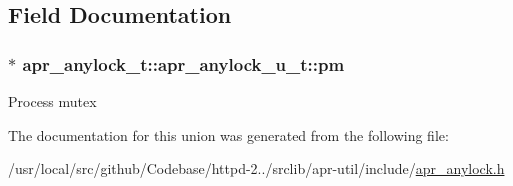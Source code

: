 \subsection{Field Documentation}
\subsubsection[{\texorpdfstring{pm}{pm}}]{$\ast$ apr\+\_\+anylock\+\_\+t\+::apr\+\_\+anylock\+\_\+u\+\_\+t\+::pm}\hypertarget{unionapr__anylock__t_1_1apr__anylock__u__t_aeb1a5d1e7a4e326482983ea956caae42}{}\label{unionapr__anylock__t_1_1apr__anylock__u__t_aeb1a5d1e7a4e326482983ea956caae42}
Process mutex 

The documentation for this union was generated from the following file\+:\begin{DoxyCompactItemize}
\item 
/usr/local/src/github/\+Codebase/httpd-\/2../srclib/apr-\/util/include/\hyperlink{apr__anylock_8h}{apr\+\_\+anylock.\+h}\end{DoxyCompactItemize}
